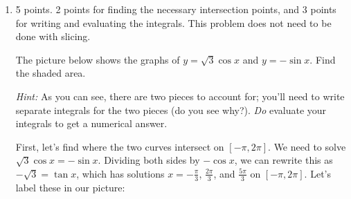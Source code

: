 \documentclass{article}
\begin{document}
\begin{enumerate}



  \item

\begin{grading}
    5 points. 2 points for finding the necessary intersection points, and 3 points for
writing and evaluating the integrals. This problem does not need to be done with slicing.
\end{grading}

\begin{problem}[\vfill]
    The picture below shows the graphs of $y = \sqrt{3} \cos x$ and $y = -
    \sin x$.  Find the shaded area.

    \emph{Hint:} As you can see, there are two pieces to account for;
    you'll need to write separate integrals for the two pieces (do you see
    why?).  \emph{Do} evaluate your integrals to get a numerical answer.

  \end{problem}

  \begin{solution}
    First, let's find where the two curves intersect on $[-\pi, 2\pi]$.
    We need to solve $\sqrt{3} \cos x = - \sin x$.  Dividing both sides by
    $-\cos x$, we can rewrite this as $-\sqrt{3} = \tan x$, which has
    solutions $x = - \frac{\pi}{3}$, $\frac{2 \pi}{3}$, and $\frac{5
      \pi}{3}$ on $[-\pi, 2\pi]$.  Let's label these in our picture:


\end{solution}
\end{enumerate}
\end{document}
